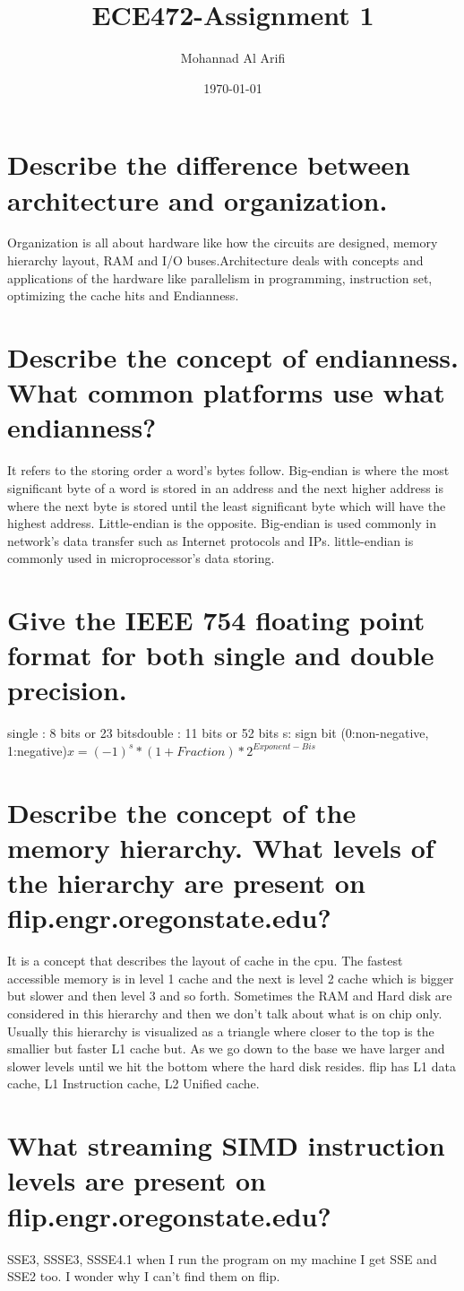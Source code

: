\documentclass[a4paper]{article}
\title{ECE472-Assignment 1}
\author{Mohannad Al Arifi}
\date{\today}
\begin{document}
\maketitle

\section{Describe the difference between architecture and organization.}
Organization is all about hardware like how the circuits are designed, memory hierarchy layout, RAM and I/O buses.\newline Architecture deals with concepts and applications of the hardware like parallelism in programming, instruction set, optimizing the cache hits and Endianness. 
\section{Describe the concept of endianness. What common platforms use what endianness?}
It refers to the storing order a word's bytes follow. Big-endian is where the most significant byte of a word is stored in an address and the next higher address is where the next byte is stored until the least significant byte which will have the highest address. Little-endian is the opposite. Big-endian is used commonly in network's data transfer such as Internet protocols and IPs. little-endian is commonly used in microprocessor's data storing. 
\section{Give the IEEE 754 floating point format for both single and double precision.}
single : 8 bits or 23 bits\newline double : 11 bits or 52 bits
\newline s: sign bit (0:non-negative, 1:negative)\newline\(x =  (-1)^s * (1+Fraction) * 2^{Exponent - Bis}\)
\section{Describe the concept of the memory hierarchy. What levels of the hierarchy are present on flip.engr.oregonstate.edu?}
It is a concept that describes the layout of cache in the cpu. The fastest accessible memory is in level 1 cache and the next is level 2 cache which is bigger but slower and then level 3 and so forth. Sometimes the RAM and Hard disk are considered in this hierarchy and then we don't talk about what is on chip only. Usually this hierarchy is visualized as a triangle where closer to the top is the smallier but faster L1 cache but. As we go down to the base we have larger and slower levels until we hit the bottom where the hard disk resides.  \newline\newline
flip has L1 data cache, L1 Instruction cache, L2 Unified cache. 

\section{What streaming SIMD instruction levels are present on flip.engr.oregonstate.edu?}
SSE3, SSSE3, SSSE4.1
\newline when I run the program on my machine I get SSE and SSE2 too. I wonder why I can't find them on flip.
\end{document}
